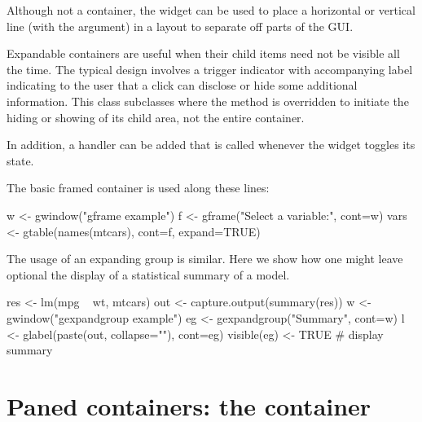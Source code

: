 Although not a container, the  widget can be
used to place a horizontal or vertical line (with the
 argument) in a layout to separate off parts of
the GUI. 


Expandable containers are useful when their child items need not be
visible all the time. The typical design involves a trigger indicator
with accompanying label indicating to the user that a click can
disclose or hide some additional information. This class subclasses
 where the  method
is overridden to initiate the hiding or showing of its child area, not
the entire container.

In addition, a handler can be added that is called whenever the widget
toggles its state.


The basic framed container is used along these lines:
\begin{Schunk}
\begin{Sinput}
 w <- gwindow("gframe example")
 f <- gframe("Select a variable:", cont=w)
 vars <- gtable(names(mtcars), cont=f, expand=TRUE)
\end{Sinput}
\end{Schunk}


The usage of an expanding group is similar. Here we show how one might
leave optional the display of a statistical summary of a model.
\begin{Schunk}
\begin{Sinput}
 res <- lm(mpg ~ wt, mtcars)
 out <- capture.output(summary(res))
 w <- gwindow("gexpandgroup example")
 eg <- gexpandgroup("Summary", cont=w)
 l <- glabel(paste(out, collapse="\n"), cont=eg)
 visible(eg) <- TRUE                     # display summary
\end{Sinput}
\end{Schunk}









\section{Paned containers: the  container}
\label{sec:gWidgets-gpanedgroup-container}

